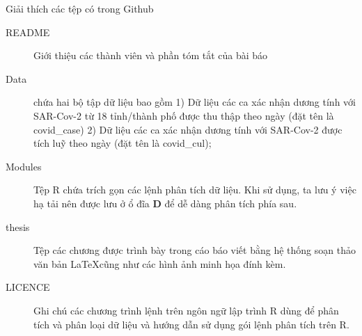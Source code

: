 \documentclass[../thesis.tex]{subfiles}
\begin{document}
Giải thích các tệp có trong Github
\begin{description}
	\item[README] Giới thiệu các thành viên và phần tóm tắt của bài báo
	\item[Data] chứa hai bộ tập dữ liệu bao gồm 1) Dữ liệu các ca xác nhận dương tính với SAR-Cov-2 từ 18 tỉnh/thành phố được thu thập theo ngày (đặt tên là \textsf{covid\_case}) 2) Dữ liệu các ca xác nhận dương tính với SAR-Cov-2 được tích luỹ theo ngày (đặt tên là \textsf{covid\_cul});
	\item[Modules] Tệp R chứa trích gọn các lệnh phân tích dữ liệu. Khi sử dụng, ta lưu ý việc hạ tải nên được lưu ở ổ đĩa \textbf{D} để dễ dàng phân tích phía sau. 
	\item[thesis] Tệp các chương được trình bày trong cáo báo viết bằng hệ thống soạn thảo văn bản \LaTeX cũng như các hình ảnh minh họa đính kèm.
	\item[LICENCE] Ghi chú các chương trình lệnh trên ngôn ngữ lập trình R dùng để phân tích và phân loại dữ liệu và hướng dẫn sử dụng gói lệnh phân tích trên R.
\end{description}
\end{document}
